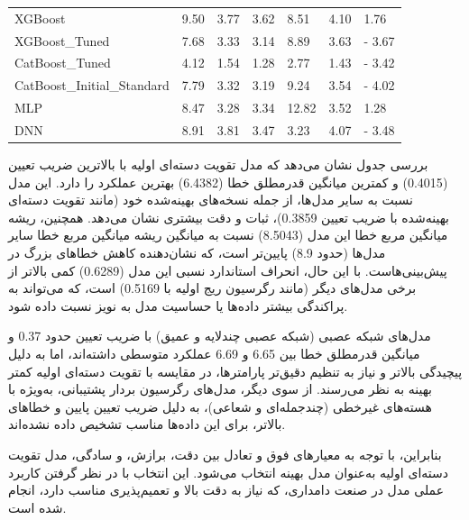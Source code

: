 \begin{table}[H]
\begin{LTR}
\begin{adjustbox}{width=\columnwidth}
\begin{tabular}{
					>{\centering\arraybackslash}m{4.3cm}
					*{6}{>{\centering\arraybackslash}m{2cm}}
				}
				XGBoost  & \num{9.50} & \num{3.77} & \num{3.62} & \num{8.51} & \num{4.10} & \num{1.76} \\
				XGBoost\_Tuned  & \num{7.68} & \num{3.33} & \num{3.14} & \num{8.89} & \num{3.63} & - \num{3.67} \\
				CatBoost\_Tuned  & \num{4.12} & \num{1.54} & \num{1.28} & \num{2.77} & \num{1.43} & - \num{3.42} \\
				CatBoost\_Initial\_Standard  & \num{7.79} & \num{3.32} & \num{3.19} & \num{9.24} & \num{3.54} & - \num{4.02} \\
				MLP  & \num{8.47} & \num{3.28} & \num{3.34} & \num{12.82} & \num{3.52} & \num{1.28} \\
				DNN  & \num{8.91} & \num{3.81} & \num{3.47} & \num{3.23} & \num{4.07} & - \num{3.48} \\
				\bottomrule
			\end{tabular}
		\end{adjustbox}
	\end{LTR}
\end{table}

بررسی جدول نشان می‌دهد که مدل تقویت دسته‌ای اولیه با بالاترین ضریب تعیین (\num{0.4015}) و کمترین میانگین قدرمطلق خطا (\num{6.4382}) بهترین عملکرد را دارد. این مدل نسبت به سایر مدل‌ها، از جمله نسخه‌های بهینه‌شده خود (مانند تقویت دسته‌ای بهینه‌شده با ضریب تعیین \num{0.3859})، ثبات و دقت بیشتری نشان می‌دهد. همچنین، ریشه میانگین مربع خطا این مدل (\num{8.5043}) نسبت به میانگین ریشه میانگین مربع خطا سایر مدل‌ها (حدود \num{8.9}) پایین‌تر است، که نشان‌دهنده کاهش خطاهای بزرگ در پیش‌بینی‌هاست. با این حال، انحراف استاندارد نسبی این مدل (\num{0.6289}) کمی بالاتر از برخی مدل‌های دیگر (مانند رگرسیون ریج اولیه با \num{0.5169}) است، که می‌تواند به پراکندگی بیشتر داده‌ها یا حساسیت مدل به نویز نسبت داده شود.

مدل‌های شبکه عصبی (شبکه عصبی چندلایه و عمیق) با ضریب تعیین حدود \num{0.37} و میانگین قدرمطلق خطا بین \num{6.65} و \num{6.69} عملکرد متوسطی داشته‌اند، اما به دلیل پیچیدگی بالاتر و نیاز به تنظیم دقیق‌تر پارامترها، در مقایسه با تقویت دسته‌ای اولیه کمتر بهینه به نظر می‌رسند. از سوی دیگر، مدل‌های رگرسیون بردار پشتیبانی، به‌ویژه با هسته‌های غیرخطی (چندجمله‌ای و شعاعی)، به دلیل ضریب تعیین پایین و خطاهای بالاتر، برای این داده‌ها مناسب تشخیص داده نشده‌اند.

بنابراین، با توجه به معیارهای فوق و تعادل بین دقت، برازش، و سادگی، مدل تقویت دسته‌ای اولیه به‌عنوان مدل بهینه انتخاب می‌شود. این انتخاب با در نظر گرفتن کاربرد عملی مدل در صنعت دامداری، که نیاز به دقت بالا و تعمیم‌پذیری مناسب دارد، انجام شده است.

